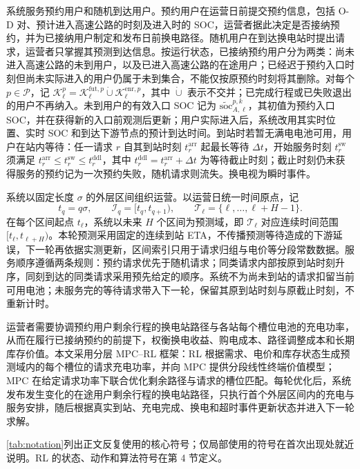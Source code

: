 \documentclass[12pt,a4paper,UTF8]{ctexart}
\begin{document}
系统服务预约用户和随机到达用户。预约用户在运营日前提交预约信息，包括 O-D 对、预计进入高速公路的时刻及进入时的 SOC，运营者据此决定是否接纳预约，并为已接纳用户制定和发布日前换电路径。随机用户在到达换电站时提出请求，运营者只掌握其预测到达信息。按运行状态，已接纳预约用户分为两类：尚未进入高速公路的未到用户，以及已进入高速公路的在途用户；已经迟于预约入口时刻但尚未实际进入的用户仍属于未到集合，不能仅按原预约时刻将其删除。对每个 $p\in\mathcal P$，记 $\mathcal K_\ell^p=\mathcal K_\ell^{\mathrm{fut},p}\mathbin{\dot\cup}\mathcal K_\ell^{\mathrm{enr},p}$，其中 $\dot\cup$ 表示不交并；已完成行程或已失败退出的用户不再纳入。未到用户的有效入口 SOC 记为 $\widetilde{\mathrm{soc}}_{A,\ell}^{p,k}$，其初值为预约入口 SOC，并在获得新的入口前观测后更新；用户实际进入后，系统改用其实时位置、实时 SOC 和到达下游节点的预计到达时间。到站时若暂无满电电池可用，用户在站内等待：任一请求 $r$ 自其到站时刻 $t_r^{\mathrm{arr}}$ 起最长等待 $\Delta t$，开始服务时刻 $t_r^{\mathrm{sw}}$ 须满足 $t_r^{\mathrm{arr}}\le t_r^{\mathrm{sw}}\le t_r^{\mathrm{ddl}}$，其中 $t_r^{\mathrm{ddl}}=t_r^{\mathrm{arr}}+\Delta t$ 为等待截止时刻；截止时刻仍未获得服务的预约记为一次预约失败，随机请求则流失。换电视为瞬时事件。

系统以固定长度 $\sigma$ 的外层区间组织运营。以运营日统一时间原点，记
\[
t_q=q\sigma,
\qquad
\mathcal I_q=[t_q,t_{q+1}),
\qquad
\mathcal T_\ell=\{\ell,\ldots,\ell+H-1\}.
\]
在每个区间起点 $t_\ell$，系统以未来 $H$ 个区间为预测域，即 $\mathcal T_\ell$ 对应连续时间范围 $[t_\ell,t_{\ell+H})$。本轮预测采用固定的连续到站 ETA，不传播预测等待造成的下游延误，下一轮再依据实测更新，区间索引只用于请求归组与电价等分段常数数据。服务顺序遵循两条规则：预约请求优先于随机请求；同类请求内部按原到站时刻升序，同刻到达的同类请求采用预先给定的顺序。系统不为尚未到站的请求扣留当前可用电池；未服务完的等待请求带入下一轮，保留其原到站时刻与原截止时刻，不重新计时。

运营者需要协调预约用户剩余行程的换电站路径与各站每个槽位电池的充电功率，从而在履行已接纳预约的前提下，权衡换电收益、购电成本、路径调整成本和长期库存价值。本文采用分层 MPC--RL 框架：RL 根据需求、电价和库存状态生成预测域内的每个槽位的请求充电功率，并向 MPC 提供分段线性终端价值模型；MPC 在给定请求功率下联合优化剩余路径与请求的槽位匹配。每轮优化后，系统发布发生变化的在途用户剩余行程的换电站路径，只执行首个外层区间内的充电与服务安排，随后根据真实到站、充电完成、换电和超时事件更新状态并进入下一轮求解。

\autoref{tab:notation}列出正文反复使用的核心符号；仅局部使用的符号在首次出现处就近说明。RL 的状态、动作和算法符号在第 4 节定义。
\end{document}
